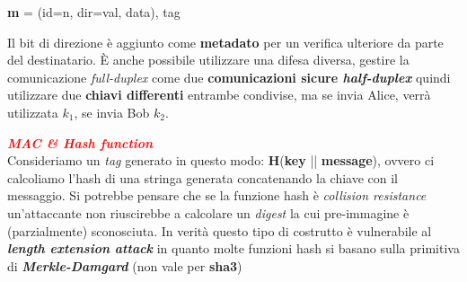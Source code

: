 \begin{flushleft}
    {\centering
        \textbf{m} = (id=n, dir=val, data), tag
    \par}

    Il bit di direzione è aggiunto come \textbf{metadato} per un verifica ulteriore da parte del destinatario. È anche possibile utilizzare una difesa diversa, gestire la comunicazione \textit{full-duplex} come due \textbf{comunicazioni sicure \textit{half-duplex}} quindi utilizzare due \textbf{chiavi differenti} entrambe condivise, ma se invia Alice, verrà utilizzata $k_1$, se invia Bob $k_2$.

    \medskip

    \textcolor{red}{\textbf{\textit{MAC \& Hash function}}} \\
    Consideriamo un \textit{tag} generato in questo modo: \textbf{H}(\textbf{key} || \textbf{message}), ovvero ci calcoliamo l'hash di una stringa generata concatenando la chiave con il messaggio. Si potrebbe pensare che se la funzione hash è \textit{collision resistance} un'attaccante non riuscirebbe a calcolare un \textit{digest} la cui pre-immagine è (parzialmente) sconosciuta. In verità questo tipo di costrutto è vulnerabile al \textbf{\textit{length extension attack}} in quanto molte funzioni hash si basano sulla primitiva di \textbf{\textit{Merkle-Damgard}} (non vale per \textbf{sha3})
\end{flushleft}

